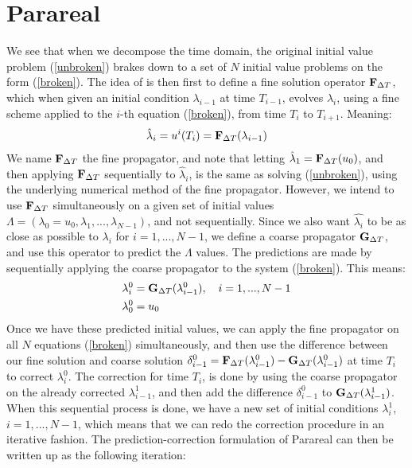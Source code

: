 \section{Parareal}\label{Parareal_sec}
We see that when we decompose the time domain, the original initial value problem (\ref{unbroken}) brakes down to a set of $N$ initial value problems on the form (\ref{broken}). The idea of \cite{baffico2002parallel} is then first to define a fine solution operator $\bold F_{\Delta T}$, which when given an initial condition $\lambda_{i-1}$ at time $T_{i-1}$, evolves $\lambda_i$, using a fine scheme applied to the $i$-th equation (\ref{broken}), from time $T_i$ to $T_{i+1}$. Meaning:
\begin{align*}
\hat \lambda_{i}= u^i(T_{i})=\bold F_{\Delta T}(\lambda_{i-1})
\end{align*} 
We name $\bold F_{\Delta T}$ the fine propagator, and note that letting $\hat \lambda_{1}=\bold F_{\Delta T}(u_0)$, and then applying $\bold F_{\Delta T}$ sequentially to $\hat \lambda_{i}$, is the same as solving (\ref{unbroken}), using the underlying numerical method of the fine propagator. However, we intend to use $\bold F_{\Delta T}$ simultaneously on a given set of initial values $\Lambda=(\lambda_0=u_0,\lambda_1,...,\lambda_{N-1})$, and not sequentially. Since we also want $\hat{\lambda_i}$ to be as close as possible to $\lambda_i$ for $i=1,...,N-1$, we define a coarse propagator $\bold G_{\Delta T}$, and use this operator to predict the $\Lambda$ values. The predictions are made by sequentially applying the coarse propagator to the system (\ref{broken}). This means:
\begin{align}
\lambda_i^0 &= \bold G_{\Delta T}(\lambda_{i-1}^0),\quad i=1,...,N-1 \\
\lambda_0^0&=u_0
\end{align} 
Once we have these predicted initial values, we can apply the fine propagator on all $N$ equations (\ref{broken}) simultaneously, and then use the difference between our fine solution and coarse solution $\delta_{i-1}^0= \bold F_ {\Delta T}( \lambda_{i-1}^0)-\bold G_ {\Delta T}( \lambda_{i-1}^0)$ at time $T_{i}$ to correct $\lambda_i^0$. The correction for time $T_i$, is done by using the coarse propagator on the already corrected $\lambda_{i-1}^1$, and then add the difference $\delta_{i-1}^0$ to $\bold G_ {\Delta T}(\lambda_{i-1}^1)$. When this sequential process is done, we have a new set of initial conditions $\lambda_i^1$, $i=1,...,N-1$, which means that we can redo the correction procedure in an iterative fashion. The prediction-correction formulation of Parareal can then be written up as the following iteration:
